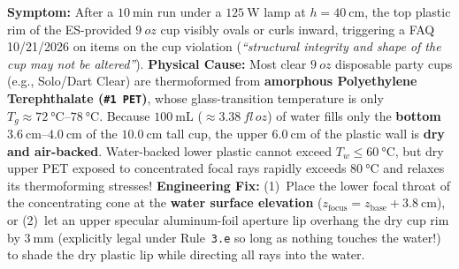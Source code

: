 \begin{trapbox}
\textbf{Symptom:} After a $\SI{10}{\minute}$ run under a $\SI{125}{\watt}$ lamp at $h = \SI{40}{\centi\meter}$, the top plastic rim of the ES-provided $\SI{9}{oz}$ cup visibly ovals or curls inward, triggering a FAQ 10/21/2026 on items on the cup violation (\textit{``structural integrity and shape of the cup may not be altered''}).
\textbf{Physical Cause:} Most clear $\SI{9}{oz}$ disposable party cups (e.g., Solo/Dart Clear) are thermoformed from \textbf{amorphous Polyethylene Terephthalate (\texttt{\#1~PET})}, whose glass-transition temperature is only $T_g \approx \SIrange{72}{78}{\celsius}$. Because $\SI{100}{\milli\liter}$ ($\approx \SI{3.38}{fl\,oz}$) of water fills only the \textbf{bottom $\SIrange{3.6}{4.0}{\centi\meter}$} of the $\SI{10.0}{\centi\meter}$ tall cup, the upper $\SI{6.0}{\centi\meter}$ of the plastic wall is \textbf{dry and air-backed}. Water-backed lower plastic cannot exceed $T_w \le \SI{60}{\celsius}$, but dry upper PET exposed to concentrated focal rays rapidly exceeds $\SI{80}{\celsius}$ and relaxes its thermoforming stresses!
\textbf{Engineering Fix:} (1)~Place the lower focal throat of the concentrating cone at the \textbf{water surface elevation} ($z_{\mathrm{focus}} = z_{\mathrm{base}} + \SI{3.8}{\centi\meter}$), or (2)~let an upper specular aluminum-foil aperture lip overhang the dry cup rim by $\SI{3}{\milli\meter}$ (explicitly legal under Rule~\texttt{3.e} so long as nothing touches the water!) to shade the dry plastic lip while directing all rays into the water.
\end{trapbox}


